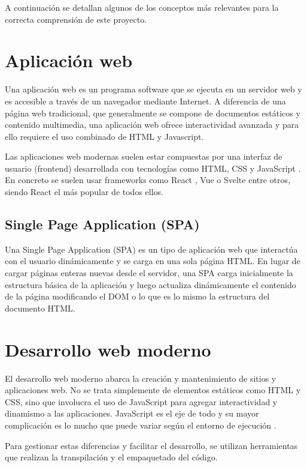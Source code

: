 A continuación se detallan algunos de los conceptos más relevantes para la correcta comprensión de este proyecto.

\section{Aplicación web}
Una aplicación web es un programa software que se ejecuta en un servidor web y es accesible a través de un navegador mediante Internet. A diferencia de una página web tradicional, que generalmente se compone de documentos estáticos y contenido multimedia, una aplicación web ofrece interactividad avanzada y para ello requiere el uso combinado de HTML y Javascript.

Las aplicaciones web modernas suelen estar compuestas por una interfaz de usuario (frontend) desarrollada con tecnologías como HTML, CSS y JavaScript \cite{wiki:javascript}. En concreto se suelen usar frameworks como React \cite{react}, Vue \cite{Vue} o Svelte \cite{Svelte} entre otros, siendo React el más popular de todos ellos.

\subsection{Single Page Application (SPA)}
Una Single Page Application (SPA) \cite{mdn-docs:spa} es un tipo de aplicación web que interactúa con el usuario dinámicamente y se carga en una sola página HTML. En lugar de cargar páginas enteras nuevas desde el servidor, una SPA carga inicialmente la estructura básica de la aplicación y luego actualiza dinámicamente el contenido de la página modificando el DOM o lo que es lo mismo la estructura del documento HTML.

\section{Desarrollo web moderno}
El desarrollo web moderno abarca la creación y mantenimiento de sitios y aplicaciones web. No se trata simplemente de elementos estáticos como HTML y CSS, sino que involucra el uso de JavaScript para agregar interactividad y dinamismo a las aplicaciones. JavaScript es el eje de todo y su mayor complicación es lo mucho que puede variar según el entorno de ejecución \cite{mdn-docs:frameworks-tooling}.

Para gestionar estas diferencias y facilitar el desarrollo, se utilizan herramientas que realizan la transpilación y el empaquetado del código.

